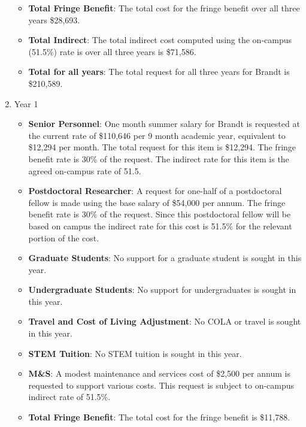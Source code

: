 \begin{enumerate}
\begin{itemize}[noitemsep,nolistsep]
\item {{\bf Total Fringe Benefit}: The total cost for the fringe benefit over all three years \$28,693.}

\item {{\bf Total Indirect}: The total indirect cost computed using the on-campus (51.5\%) rate is over all three years is \$71,586.}

\item {{\bf Total for all years}: The total request for all three years for Brandt is \$210,589.}

\end{itemize}

\item{Year 1}
\begin{itemize}[noitemsep,nolistsep]
\item{{\bf Senior Personnel}: One month summer salary for Brandt is requested at the current rate of \$110,646 per 9 month academic year, equivalent to \$12,294 per month.  The total request for this item is \$12,294. The fringe benefit rate is 30\% of the request.  The indirect rate for this item is the agreed on-campus rate of 51.5.}

\item {{\bf Postdoctoral Researcher}: A request for one-half of a postdoctoral fellow is made using the base salary of \$54,000 per annum.  The fringe benefit rate is 30\% of the request.  Since this postdoctoral fellow will be based on campus the indirect rate for this cost is 51.5\% for the relevant portion of the cost. } 

\item{{\bf Graduate Students}: No support for a graduate student is sought in this year. }

\item {{\bf Undergraduate Students}: No support for undergraduates is sought in this year.}

\item{{\bf Travel and Cost of Living Adjustment}: No COLA or travel is sought in this year.}

\item {{\bf STEM Tuition}: No STEM tuition is sought in this year.}

\item {{\bf M\&S}: A modest maintenance and services cost of \$2,500 per annum is requested to support various costs.   This request is subject to on-campus indirect rate of 51.5\%.}

\item {{\bf Total Fringe Benefit}: The total cost for the fringe benefit is \$11,788.}


\end{itemize}
\end{enumerate}
